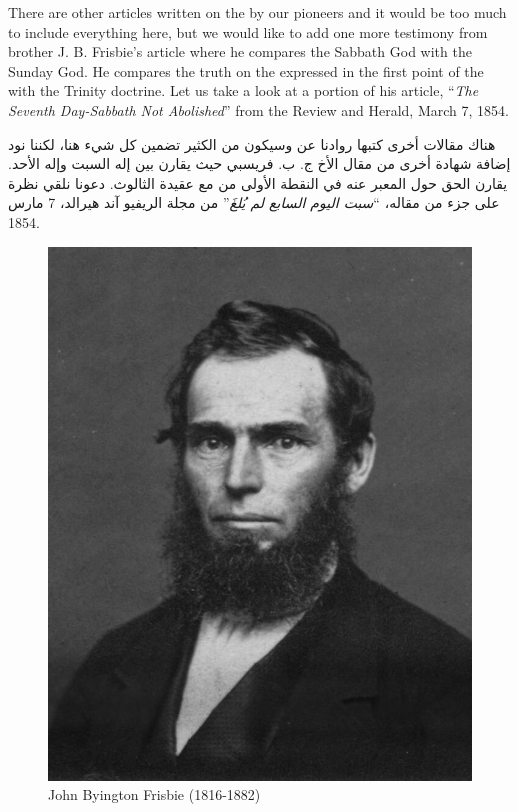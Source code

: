 



There are other articles written on the  by our pioneers and it would be too much to include everything here, but we would like to add one more testimony from brother J. B. Frisbie’s article where he compares the Sabbath God with the Sunday God. He compares the truth on the  expressed in the first point of the  with the Trinity doctrine. Let us take a look at a portion of his article, “\textit{The Seventh Day-Sabbath Not Abolished}” from the Review and Herald, March 7, 1854.


هناك مقالات أخرى كتبها روادنا عن  وسيكون من الكثير تضمين كل شيء هنا، لكننا نود إضافة شهادة أخرى من مقال الأخ ج. ب. فريسبي حيث يقارن بين إله السبت وإله الأحد. يقارن الحق حول  المعبر عنه في النقطة الأولى من  مع عقيدة الثالوث. دعونا نلقي نظرة على جزء من مقاله، “\textit{سبت اليوم السابع لم يُلغَ}” من مجلة الريفيو آند هيرالد، 7 مارس 1854.


\begin{figure}[hp]
    \centering
    \includegraphics[width=1\linewidth]{images/j-b-frisbie.jpg}
    \caption*{John Byington Frisbie (1816-1882)}
    \label{fig:j-b-frisbie}
\end{figure}


